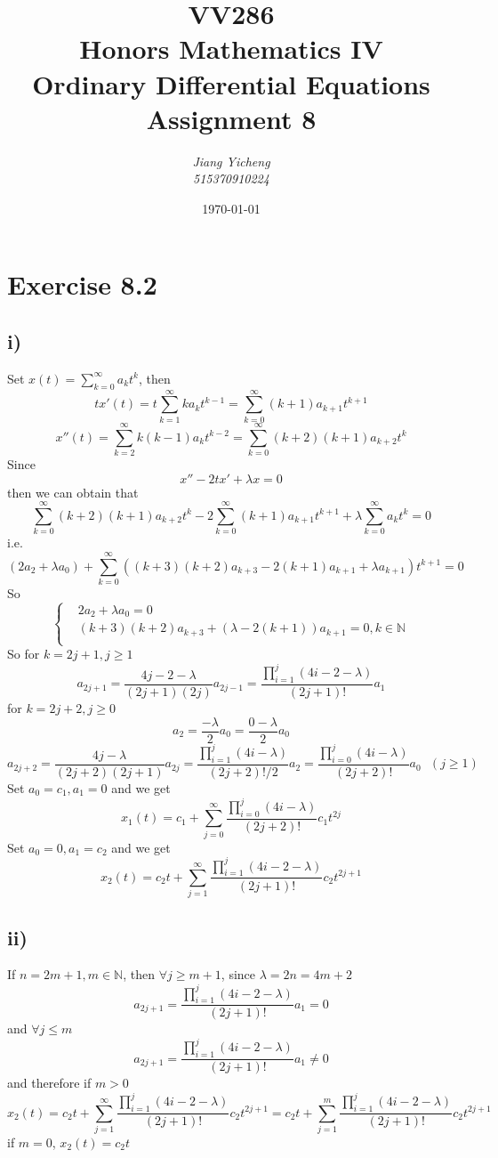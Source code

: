 \documentclass[a4paper,12pt,titlepage]{article}
\author{\textit{Jiang Yicheng}\\\textit{515370910224}}
\title{\textbf{VV286\\ Honors Mathematics IV\\
Ordinary Differential Equations\\
		Assignment 8}}
\date{\today}
\begin{document}
\maketitle

\section*{Exercise 8.2}
\subsection*{i)}
Set $x(t)=\sum\limits_{k=0}^{\infty}a_kt^k$, then
$$tx'(t)=t\sum\limits_{k=1}^{\infty}ka_kt^{k-1}=\sum\limits_{k=0}^{\infty}(k+1)a_{k+1}t^{k+1}$$
$$x''(t)=\sum\limits_{k=2}^{\infty}k(k-1)a_kt^{k-2}=\sum\limits_{k=0}^{\infty}(k+2)(k+1)a_{k+2}t^{k}$$
Since 
$$x''-2tx'+\lambda x=0$$
then we can obtain that
$$\sum\limits_{k=0}^{\infty}(k+2)(k+1)a_{k+2}t^{k}-2\sum\limits_{k=0}^{\infty}(k+1)a_{k+1}t^{k+1}+\lambda\sum\limits_{k=0}^{\infty}a_kt^k=0$$
i.e.
$$(2a_2+\lambda a_0)+\sum\limits_{k=0}^{\infty}((k+3)(k+2)a_{k+3}-2(k+1)a_{k+1}+\lambda a_{k+1})t^{k+1}=0$$
So
$$\left\{
\begin{aligned}
&2a_2+\lambda a_0=0\\
&(k+3)(k+2)a_{k+3}+(\lambda-2(k+1))a_{k+1}=0,k\in\mathbb{N}\\
\end{aligned}
\right.$$
So for $k=2j+1,j\geqslant1$
$$a_{2j+1}=\dfrac{4j-2-\lambda}{(2j+1)(2j)}a_{2j-1}=\dfrac{\prod\limits_{i=1}^j(4i-2-\lambda)}{(2j+1)!}a_1$$
for $k=2j+2,j\geqslant0$
$$a_2=\dfrac{-\lambda}{2}a_0=\dfrac{0-\lambda}{2}a_0$$
$$a_{2j+2}=\dfrac{4j-\lambda}{(2j+2)(2j+1)}a_{2j}=\dfrac{\prod\limits_{i=1}^j(4i-\lambda)}{(2j+2)!/2}a_2=\dfrac{\prod\limits_{i=0}^j(4i-\lambda)}{(2j+2)!}a_0\,\,\,\,(j\geqslant1)$$
Set $a_0=c_1,a_1=0$ and we get
$$x_1(t)=c_1+\sum\limits_{j=0}^{\infty}\dfrac{\prod\limits_{i=0}^j(4i-\lambda)}{(2j+2)!}c_1t^{2j}$$
Set $a_0=0,a_1=c_2$ and we get
$$x_2(t)=c_2t+\sum\limits_{j=1}^{\infty}\dfrac{\prod\limits_{i=1}^j(4i-2-\lambda)}{(2j+1)!}c_2t^{2j+1}$$

\subsection*{ii)}
If $n=2m+1,m\in\mathbb{N}$, then $\forall j\geqslant m+1$, since $\lambda=2n=4m+2$
$$a_{2j+1}=\dfrac{\prod\limits_{i=1}^j(4i-2-\lambda)}{(2j+1)!}a_1=0$$
and $\forall j\leqslant m$
$$a_{2j+1}=\dfrac{\prod\limits_{i=1}^j(4i-2-\lambda)}{(2j+1)!}a_1\neq0$$
and therefore if $m>0$
$$x_2(t)=c_2t+\sum\limits_{j=1}^{\infty}\dfrac{\prod\limits_{i=1}^j(4i-2-\lambda)}{(2j+1)!}c_2t^{2j+1}=c_2t+\sum\limits_{j=1}^{m}\dfrac{\prod\limits_{i=1}^j(4i-2-\lambda)}{(2j+1)!}c_2t^{2j+1}$$
if $m=0$, $x_2(t)=c_2t$
\end{document}
